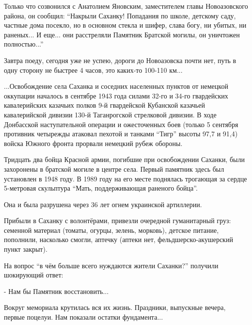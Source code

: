 \begin{multicols}{2} %
\setlength{\parindent}{0pt}



Только что созвонился с Анатолием Яновским, заместителем главы Новоазовского
района, он сообщил: \enquote{Накрыли Саханку! Попадания по школе, детскому саду,
частные дома посекло, но в основном стекла и шифер, слава богу, ни убитых, ни
раненых... И еще... они расстреляли Памятник Братской могилы, он уничтожен
полностью...}


Завтра поеду, сегодня уже не успею, дороги до Новоазовска почти нет, путь в
одну сторону не быстрее 4 часов, это каких-то 100-110 км...

...Освобождение села Саханка и соседних населенных пунктов от немецкой
оккупации началось в сентябре 1943 года силами 32-го и 34-го гвардейских
кавалерийских казачьих полков 9-й гвардейской Кубанской казачьей кавалерийской
дивизии 130-й Таганрогской стрелковой дивизии. В ходе Донбасской наступательной
операции и ожесточенных боев (только 5 сентября противник четырежды атаковал
пехотой и танками \enquote{Тигр} высоты 97,7 и 91,4) войска Южного фронта прорвали
немецкий рубеж обороны.


Тридцать два бойца Красной армии, погибшие при освобождении Саханки, были
захоронены в братской могиле в центре села. Первый памятник здесь был
установлен в 1948 году. В 1989 году на его месте поднялась трогающая за сердце
5-метровая скульптура \enquote{Мать, поддерживающая раненого бойца}.

Она и была разрушена через 36 лет огнем украинской артиллерии.


Прибыли в Саханку с волонтёрами, привезли очередной гуманитарный груз: семенной
материал (томаты, огурцы, зелень, морковь), детское питание, пополнили,
насколько смогли, аптечку (аптеки нет, фельдшерско-акушерский пункт закрыт).

На вопрос \enquote{в чём больше всего нуждаются жители Саханки?} получили
шокирующий ответ:

- Нам бы Памятник восстановить...

Вокруг мемориала крутилась вся их жизнь. Праздники, выпускные вечера, первые
поцелуи. Нам показали остатки фундамента...


\end{multicols}
